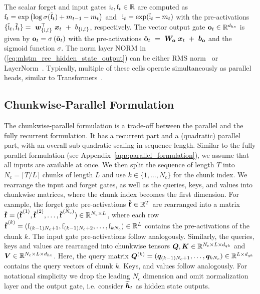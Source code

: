 \documentclass{article}
\newcommand{\expGate}[1]{{#1}}
\newcommand{\gates}[1]{{#1}}
\begin{document}
The scalar forget and input gates $\mathrm{i}_t, \mathrm{f}_t \in \mathbb{R}$ are computed as
$ \gates{\Rf_t} = \exp \left( \log \sigma(\tilde{\Rf}_t) + m_{t-1} - m_t \right)$ and $ \expGate{\ \Ri_t} = {\exp(\tilde{\Ri}_t - m_t)}$ with the pre-activations $\{\tilde{\Ri}_t, \tilde{\Rf}_t\} = \ \Bw^\top_{\{\Ri, \Rf\}} \ \Bx_t \ + \ b_{\{\Ri, \Rf\}}$, respectively. 
The vector output gate $\mathbf{o}_t \in \mathbb{R}^{d_{hv}}$ is given by $\gates{\bfo_t} = \sigma \left( \tilde{\bfo}_t \right)$ with the pre-activations $\tilde{\mathbf{o}}_t  \ = \ \bm{W}_{\mathbf{o}} \ \bm{x}_t \ + \ \bm{b}_{\mathbf{o}}$ and the sigmoid function $\sigma$.
The norm layer $\mathrm{NORM}$ in (\ref{eq:mlstm_rec_hidden_state_output}) can be either RMS norm~\citep{zhang:19rmsnorm} or LayerNorm~\citep{ba:16layernorm}.
Typically, multiple of these cells operate simultaneously as parallel heads, similar to Transformers~\citep{vaswani:17attention}.

\vspace{-0.1cm}
\subsection{Chunkwise-Parallel Formulation}
\label{sec:chunkwise_parallel_formulation}
\vspace{-0.1cm}
The chunkwise-parallel formulation is a trade-off between the parallel and the fully recurrent formulation.
It has a recurrent part and a (quadratic) parallel part, with an overall sub-quadratic scaling in sequence length.
Similar to the fully parallel formulation (see Appendix~\ref{app:parallel_formulation}), we assume that all inputs are available at once.
We then split the sequence of length $T$ into $N_c= \lceil T/L \rceil$ chunks of length $L$ and use $k \in \{1,\dots, N_c\}$ for the chunk index.
We rearrange the input and forget gates, as well as the queries, keys, and values into chunkwise matrices, where the chunk index becomes the first dimension.
For example, the forget gate pre-activations $\tilde{\bm{\mathrm{f}}} \in \mathbb{R}^{T}$ are rearranged into a matrix $\tilde{\bm{\mathrm{f}}} = (\tilde{\bm{\mathrm{f}}}^{(1)}, \tilde{\bm{\mathrm{f}}}^{(2)}, \dots, \tilde{\bm{\mathrm{f}}}^{(N_c)} ) \in \mathbb{R}^{N_c \times L}$,
where each row ${\tilde{\bm{\mathrm{f}}}^{(k)}} = (\mathrm{f}_{(k-1)N_c+1}, \mathrm{f}_{(k-1)N_c+2}, \dots, \mathrm{f}_{k N_c}) \in \mathbb{R}^{L}$ contains the pre-activations of the chunk $k$.
The input gate pre-activations follow analogously.
Similarly, the queries, keys and values are rearranged into chunkwise tensors $\bm{Q}, \bm{K} \in \mathbb{R}^{N_c \times L \times d_{qk}}$ and $\bm{V} \in \mathbb{R}^{N_c \times L \times d_{hv}}$.
Here, the query matrix $\bm{Q}^{(k)} = (\bm{q}_{(k-1)N_c+1}, \dots, \bm{q}_{k N_c}) \in \mathbb{R}^{L \times d_{qk}}$ contains the query vectors of chunk $k$. Keys, and values follow analogously.
For notational simplicity we drop the leading $N_c$ dimension and omit normalization layer and the output gate, i.e. consider $\widetilde{\bm{h}}_t$ as hidden state outputs.
\vspace{-0.2cm}
\end{document}
